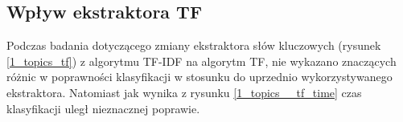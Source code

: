 \documentclass{classrep}
\begin{document}
\subsection{Wpływ ekstraktora TF}
Podczas badania dotyczącego zmiany ekstraktora słów kluczowych (rysunek \ref{1_topics_tf}) z
algorytmu TF-IDF na algorytm TF,
nie wykazano znaczących różnic w poprawności klasyfikacji w stosunku do uprzednio
wykorzystywanego ekstraktora. Natomiast jak wynika z rysunku \ref{1_topics__tf_time} czas klasyfikacji
uległ nieznacznej poprawie.
%
%
\end{document}

